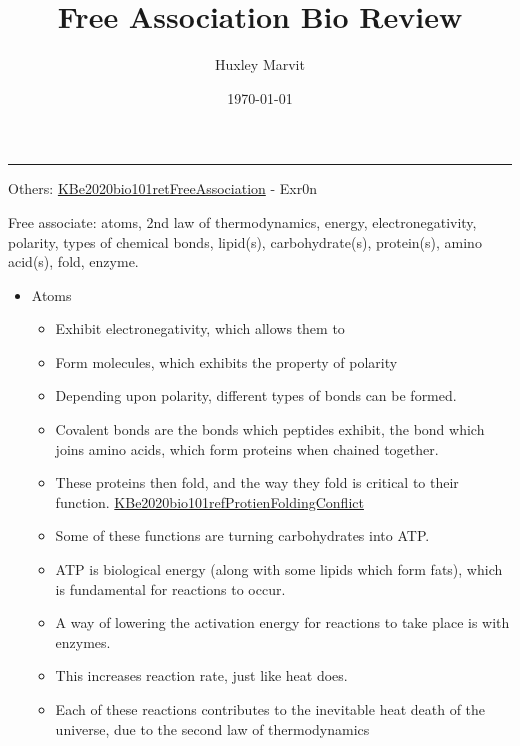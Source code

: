 \documentclass[letterpaper]{article}
\author{Huxley Marvit}
\date{\today}
\title{Free Association Bio Review}
\renewcommand\maketitle{}
\begin{document}
\maketitle
\noindent\rule{\textwidth}{0.5pt}

Others:
\href{KBe2020bio101retFreeAssociation.org}{KBe2020bio101retFreeAssociation} -
Exr0n

Free associate: atoms, 2nd law of thermodynamics, energy,
electronegativity, polarity, types of chemical bonds, lipid(s),
carbohydrate(s), protein(s), amino acid(s), fold, enzyme.

\begin{itemize}
\item Atoms

\begin{itemize}
\item Exhibit electronegativity, which allows them to
\item Form molecules, which exhibits the property of polarity
\item Depending upon polarity, different types of bonds can be formed.
\item Covalent bonds are the bonds which peptides exhibit, the bond which
joins amino acids, which form proteins when chained together.
\item These proteins then fold, and the way they fold is critical to their
function.
\href{KBe2020bio101refProtienFoldingConflict.org}{KBe2020bio101refProtienFoldingConflict}
\item Some of these functions are turning carbohydrates into ATP.
\item ATP is biological energy (along with some lipids which form fats),
which is fundamental for reactions to occur.
\item A way of lowering the activation energy for reactions to take place
is with enzymes.
\item This increases reaction rate, just like heat does.
\item Each of these reactions contributes to the inevitable heat death of
the universe, due to the second law of thermodynamics
\end{itemize}
\end{itemize}
\end{document}
